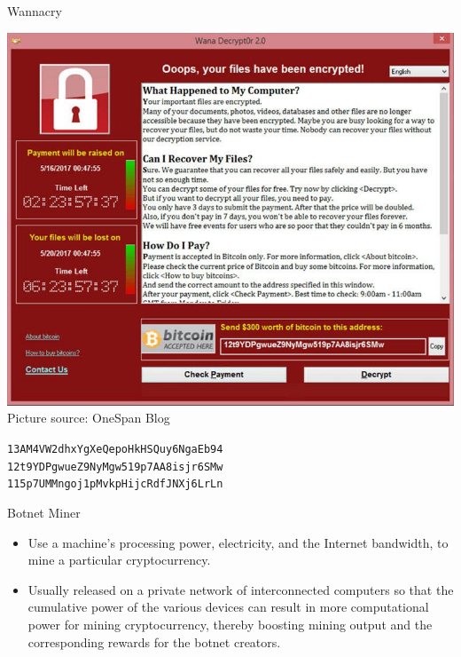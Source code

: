 \documentclass[]{beamer}
\begin{document}
\begin{frame}{Wannacry}
	\begin{center}
		\includegraphics[scale=0.28]{../assets/images/wannacry} \\
		\footnotesize{Picture source: OneSpan Blog}\\
		\vspace{1em}
	\begin{small}
	\texttt{13AM4VW2dhxYgXeQepoHkHSQuy6NgaEb94} \link \href{https://blockstream.info/address/13AM4VW2dhxYgXeQepoHkHSQuy6NgaEb94}{} \\
	\texttt{12t9YDPgwueZ9NyMgw519p7AA8isjr6SMw} \link \href{https://blockstream.info/address/12t9YDPgwueZ9NyMgw519p7AA8isjr6SMw}{} \\
	\texttt{115p7UMMngoj1pMvkpHijcRdfJNXj6LrLn} \link \href{https://blockstream.info/address/115p7UMMngoj1pMvkpHijcRdfJNXj6LrLn} {} \\
	\end{small}
	\end{center}
\end{frame}


\begin{frame}{Botnet Miner}
\begin{itemize}
\item Use a machine’s processing power, electricity, and the Internet bandwidth, to mine a particular cryptocurrency.
\item Usually released on a private network of interconnected computers so that the cumulative power of the various devices can result in more computational power for mining cryptocurrency, thereby boosting mining output and the corresponding rewards for the botnet creators.
\end{itemize}
\end{frame}
\end{document}
